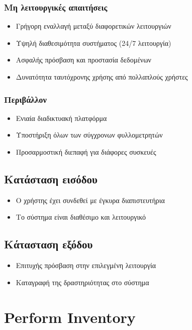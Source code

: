 \documentclass[12pt,a4paper,twoside]{book}
\begin{document}
\subsubsection{Μη λειτουργικές απαιτήσεις}
\begin{itemize}
  \item Γρήγορη εναλλαγή μεταξύ διαφορετικών λειτουργιών %
  \item Υψηλή διαθεσιμότητα συστήματος (24/7 λειτουργία) %
  \item Ασφαλής πρόσβαση και προστασία δεδομένων %
  \item Δυνατότητα ταυτόχρονης χρήσης από πολλαπλούς χρήστες
\end{itemize}

\subsubsection{Περιβάλλον}
\begin{itemize}
  \item Ενιαία διαδικτυακή πλατφόρμα %
  \item Υποστήριξη όλων των σύγχρονων φυλλομετρητών
  \item Προσαρμοστική διεπαφή για διάφορες συσκευές %
\end{itemize}

\subsection{Κατάσταση εισόδου} %
\begin{itemize}
  \item Ο χρήστης έχει συνδεθεί με έγκυρα διαπιστευτήρια %
  \item Το σύστημα είναι διαθέσιμο και λειτουργικό %
\end{itemize}

\subsection{Κάτασταση εξόδου} %
\begin{itemize}
  \item Επιτυχής πρόσβαση στην επιλεγμένη λειτουργία
  \item Καταγραφή της δραστηριότητας στο σύστημα %
\end{itemize}

\section{Perform Inventory}
\end{document}
